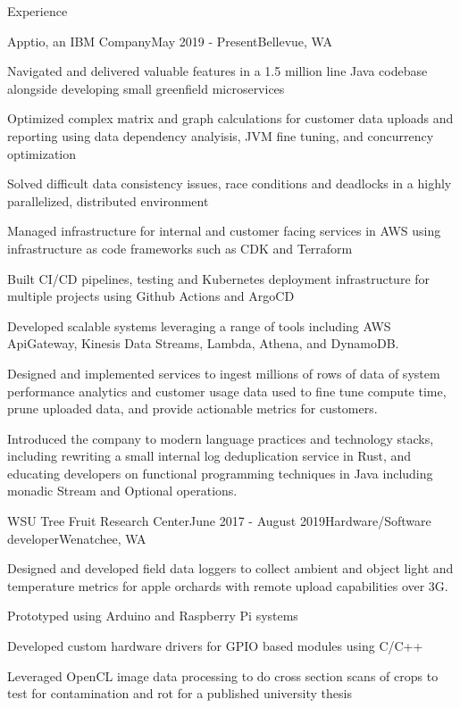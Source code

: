 \documentclass[
	11pt, %
]{resume} %
\begin{document}
\begin{rSection}{Experience}

   \begin{rSubsection}{Apptio, an IBM Company}{May 2019 - Present}{Bellevue, WA}{}
        \item Navigated and delivered valuable features in a 1.5 million line Java codebase alongside developing small greenfield microservices
        \item Optimized complex matrix and graph calculations for customer data uploads and reporting using data dependency analyisis, JVM fine tuning, and concurrency optimization
        \item Solved difficult data consistency issues, race conditions and deadlocks in a highly parallelized, distributed environment
        \item Managed infrastructure for internal and customer facing services in AWS using infrastructure as code frameworks such as CDK and Terraform
        \item Built CI/CD pipelines, testing and Kubernetes deployment infrastructure for multiple projects using Github Actions and ArgoCD
        \item Developed scalable systems leveraging a range of tools including AWS ApiGateway, Kinesis Data Streams, Lambda, Athena, and DynamoDB.
        \item Designed and implemented services to ingest millions of rows of data of system performance analytics and customer usage data used to fine tune compute time, prune uploaded data, and provide actionable metrics for customers. 
        \item Introduced the company to modern language practices and technology stacks, including rewriting a small internal log deduplication service in Rust, and educating developers on functional programming techniques in Java including monadic Stream and Optional operations.
    \end{rSubsection}

    \begin{rSubsection}{WSU Tree Fruit Research Center}{June 2017 - August 2019}{Hardware/Software developer}{Wenatchee, WA}
        \item Designed and developed field data loggers to collect ambient and object light and temperature metrics for apple orchards with remote upload capabilities over 3G.
        \item Prototyped using Arduino and Raspberry Pi systems
        \item Developed custom hardware drivers for GPIO based modules using C/C++
        \item Leveraged OpenCL image data processing to do cross section scans of crops to test for contamination and rot for a published university thesis
    \end{rSubsection}

\end{rSection}
\end{document}
